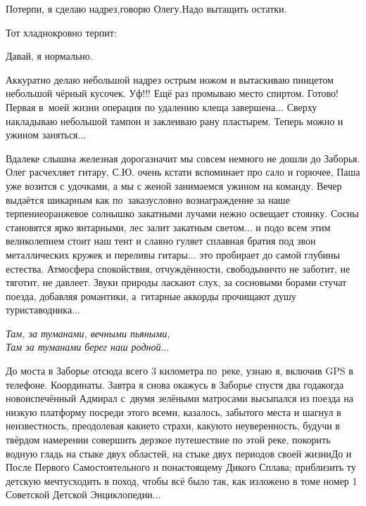 \diagdash Потерпи, я сделаю надрез,\mdash говорю Олегу.\mdash Надо вытащить остатки.

Тот хладнокровно терпит:

\diagdash Давай, я нормально.
 
Аккуратно делаю небольшой надрез острым ножом и вытаскиваю пинцетом небольшой чёрный кусочек. Уф!!! Ещё раз промываю место спиртом. Готово! Первая в~моей жизни операция по удалению клеща завершена$\ldots$ Сверху накладываю небольшой тампон и заклеиваю рану пластырем. Теперь можно и ужином заняться$\ldots$

Вдалеке слышна железная дорога\mdash значит мы совсем немного не дошли до Заборья. Олег расчехляет гитару, С.Ю. очень кстати вспоминает про сало и горючее, Паша уже возится с удочками, а мы с женой занимаемся ужином на команду. Вечер выдаётся шикарным как по~заказу\mdash словно вознаграждение за наше терпение\mdash оранжевое солнышко закатными лучами нежно освещает стоянку. Сосны становятся ярко янтарными, лес залит закатным светом$\ldots$ и подо всем этим великолепием стоит наш тент и славно гуляет сплавная братия под звон металлических кружек и переливы гитары$\ldots$ это пробирает до самой глубины естества. Атмосфера спокойствия, отчуждённости, свободы\mdash ничто не заботит, не тяготит, не давлеет. Звуки природы ласкают слух, за сосновыми борами стучат поезда, добавляя романтики, а~гитарные аккорды прочищают душу туриста\sdash водника$\ldots$ 

\vspace{0.3cm}
\noindent\textit{%
	\hspace*{1.9cm}Там, за туманами, вечными пьяными,\\
	\hspace*{1.9cm}Там за туманами берег наш родной$\ldots$ 
}
\vspace{0.3cm}

До моста в Заборье отсюда всего 3 километра по~реке, узнаю я, включив GPS в телефоне. Координаты\mdash \CoordsLidSeventeenNearZaborie. Завтра я снова окажусь в Заборье спустя два года\mdash когда новоиспечённый Адмирал с~двумя зелёными матросами высыпался из поезда на низкую платформу посреди этого всеми, казалось, забытого места и шагнул в неизвестность, преодолевая какие\sdash то страхи, какую\sdash то неуверенность, будучи в твёрдом намерении совершить дерзкое путешествие по этой реке, покорить водную гладь на стыке двух областей, на стыке двух периодов своей жизни\mdash До и После Первого Самостоятельного и по\sdash настоящему Дикого Сплава; приблизить ту детскую мечту\mdash сходить в поход, чтобы всё было так, как изложено в томе номер 1 Советской Детской Энциклопедии$\ldots$ 

